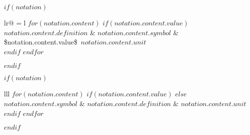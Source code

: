 \documentclass[
12pt, %
singlespacing, %
liststotoc, %
toctotoc, %
nohyperref, %
headsepline, %
]{MastersDoctoralThesis} %
\begin{document}


$if(notation)$
\begin{constants}{lr@{ {}={} }l} %
$for(notation.content)$
  $if(notation.content.value)$
  $notation.content.definition$ & $notation.content.symbol$ & \SI{$notation.content.value$}{$notation.content.unit$}\\
$endif$
$endfor$

\end{constants}
$endif$

$if(notation)$
\begin{symbols}{lll} %
$for(notation.content)$
  $if(notation.content.value)$
  $else$
  $notation.content.symbol$ & $notation.content.definition$ & \si{$notation.content.unit$} \\
$endif$
$endfor$


%

\end{symbols}
$endif$


\end{document}
